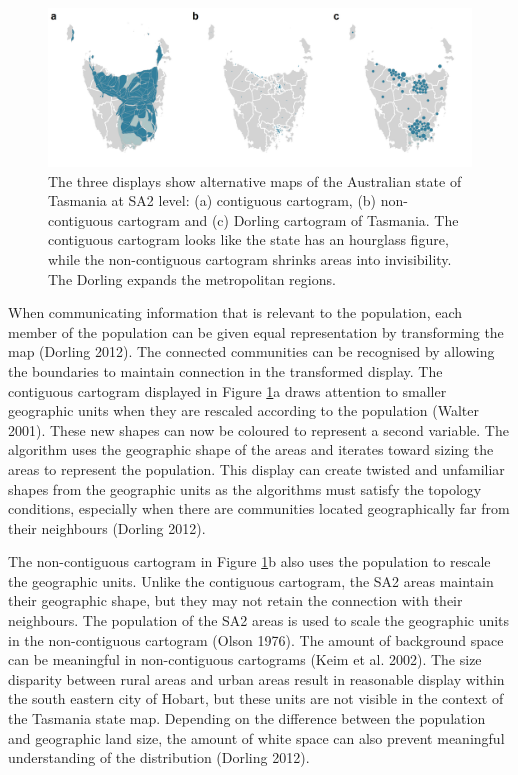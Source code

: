 \begin{figure}
\includegraphics[width=1\linewidth]{kobakian-cook_files/figure-latex/tasdisplays-1} \caption{The three displays show alternative maps of the Australian state of Tasmania at SA2 level: (a) contiguous cartogram, (b) non-contiguous cartogram and (c) Dorling cartogram of Tasmania. The contiguous cartogram looks like the state has an hourglass figure, while the non-contiguous cartogram shrinks areas into invisibility. The Dorling expands the metropolitan regions.}\label{fig:tasdisplays}
\end{figure}

When communicating information that is relevant to the population, each member of the population can be given equal representation by transforming the map (Dorling 2012). The connected communities can be recognised by allowing the boundaries to maintain connection in the transformed display. The contiguous cartogram displayed in Figure \ref{fig:tasdisplays}a draws attention to smaller geographic units when they are rescaled according to the population (Walter 2001). These new shapes can now be coloured to represent a second variable. The algorithm uses the geographic shape of the areas and iterates toward sizing the areas to represent the population. This display can create twisted and unfamiliar shapes from the geographic units as the algorithms must satisfy the topology conditions, especially when there are communities located geographically far from their neighbours (Dorling 2012).

The non-contiguous cartogram in Figure \ref{fig:tasdisplays}b also uses the population to rescale the geographic units. Unlike the contiguous cartogram, the SA2 areas maintain their geographic shape, but they may not retain the connection with their neighbours. The population of the SA2 areas is used to scale the geographic units in the non-contiguous cartogram (Olson 1976). The amount of background space can be meaningful in non-contiguous cartograms (Keim et al. 2002). The size disparity between rural areas and urban areas result in reasonable display within the south eastern city of Hobart, but these units are not visible in the context of the Tasmania state map. Depending on the difference between the population and geographic land size, the amount of white space can also prevent meaningful understanding of the distribution (Dorling 2012).

